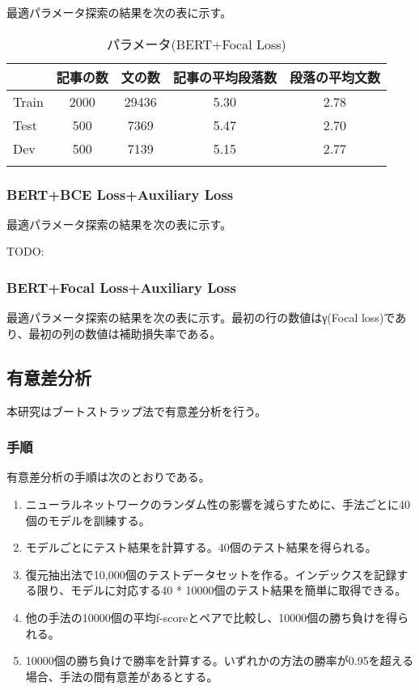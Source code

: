 \documentclass[
  platex, dvipdfmx,  %
]{nlp2021}
\begin{document}
最適パラメータ探索の結果を次の表に示す。

\begin{table*}[t]
  \centering
  \small
  \caption{パラメータ(BERT+Focal Loss)}
  \begin{tabular}{lcccc}
  \hline
  \     & 記事の数 & 文の数   & 記事の平均段落数 & 段落の平均文数 \\
  \hline
  Train & 2000 & 29436 & 5.30        & 2.78       \\
  Test  & 500  & 7369  & 5.47        & 2.70       \\
  Dev   & 500  & 7139  & 5.15        & 2.77       \\
  \hline
  \label{tab:parameter1}
  \end{tabular}
  \end{table*}

\subsubsection{BERT+BCE Loss+Auxiliary Loss}

最適パラメータ探索の結果を次の表に示す。

TODO:

\subsubsection{BERT+Focal Loss+Auxiliary Loss}

最適パラメータ探索の結果を次の表に示す。最初の行の数値はγ(Focal loss)であり、最初の列の数値は補助損失率である。

\subsection{有意差分析}

本研究はブートストラップ法で有意差分析を行う。

\subsubsection{手順}

有意差分析の手順は次のとおりである。

\begin{enumerate}
  \item ニューラルネットワークのランダム性の影響を減らすために、手法ごとに40個のモデルを訓練する。
  \item モデルごとにテスト結果を計算する。40個のテスト結果を得られる。
  \item 復元抽出法で10,000個のテストデータセットを作る。インデックスを記録する限り、モデルに対応する40 * 10000個のテスト結果を簡単に取得できる。
  \item 他の手法の10000個の平均f-scoreとペアで比較し、10000個の勝ち負けを得られる。
  \item 10000個の勝ち負けで勝率を計算する。いずれかの方法の勝率が0.95を超える場合、手法の間有意差があるとする。
\end{enumerate}
\end{document}
